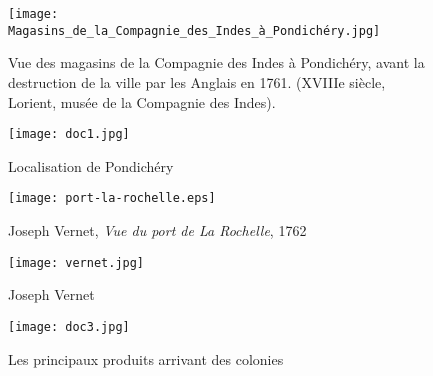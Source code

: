 \documentclass{beamer}
\begin{document}
\begin{frame}

\begin{figure}
\caption{Vue des magasins de la Compagnie des Indes à Pondichéry, avant la destruction de la ville par les Anglais en 1761. (XVIIIe siècle, Lorient, musée de la Compagnie des Indes).}  
\texttt{[image: Magasins\_de\_la\_Compagnie\_des\_Indes\_à\_Pondichéry.jpg]}

\end{figure}

\end{frame}

\begin{frame}
\begin{figure}
\caption{Localisation de Pondichéry}  
\texttt{[image: doc1.jpg]}
\end{figure}
\end{frame}




\begin{frame}

\begin{figure}
\caption{Joseph Vernet, \textit{Vue du port de La Rochelle}, 1762}  
\texttt{[image: port-la-rochelle.eps]}

\end{figure}
\end{frame}

\begin{frame}
\begin{figure}
\caption{Joseph Vernet}  
\texttt{[image: vernet.jpg]}

\end{figure}
\end{frame}


\begin{frame}
\begin{figure}
\caption{Les principaux produits arrivant des colonies}  
\texttt{[image: doc3.jpg]}

\end{figure}
\end{frame}



  
\end{document}

